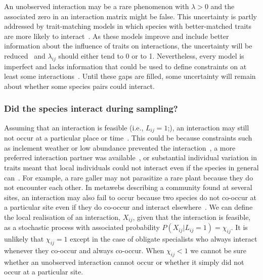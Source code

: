 \documentclass[12pt]{article}
\begin{document}
\begin{spacing}{2.0}
          An unobserved interaction may be a rare phenomenon with $\lambda>0$ and the associated zero in an interaction matrix might be false. This uncertainty is partly addressed by trait-matching models in which species with better-matched traits are more likely to interact~\citep{Bartomeus2016,Jordano2016,Weinstein2017}. As these models improve and include better information about the influence of traits on interactions, the uncertainty will be reduced~\citep{Jordano2016} and $\lambda_{ij}$ should either tend to 0 or to 1. Nevertheless, every model is imperfect and lacks information that could be used to define constraints on at least some interactions~\citep{Dormann2017}. Until these gaps are filled, some uncertainty will remain about whether some species pairs could interact.


        \subsubsection*{Did the species interact during sampling?} 

          Assuming that an interaction is feasible (i.e., $L_{ij} = 1$;), an interaction may still not occur at a particular place or time~\citep{Poisot2015,Graham2018}. This could be because constraints such as inclement weather or low abundance prevented the interaction~\citep{Jordano2016,Graham2018}, a more preferred interaction partner was available~\citep{Weinstein2017a}, or substantial individual variation in traits meant that local individuals could not interact even if the species in general can~\citep{Gravel2013,Wells2013,Poisot2015}. For example, a rare galler may not parasitize a rare plant because they do not encounter each other. In metawebs describing a community found at several sites, an interaction may also fail to occur because two species do not co-occur at a particular site even if they do co-occur and interact elsewhere~\citep{Graham2018}. We can define the local realisation of an interaction, $X_{ij}$, given that the interaction is feasible, as a stochastic process with associated probability $P(X_{ij}|L_{ij} = 1) = \chi_{ij}$. It is unlikely that $\chi_{ij} = 1$  except in the case of obligate specialists who always interact whenever they co-occur and always co-occur. When $\chi_{ij} < 1$ we cannot be sure whether an unobserved interaction cannot occur or whether it simply did not occur at a particular site.



\end{spacing}
\end{document}
